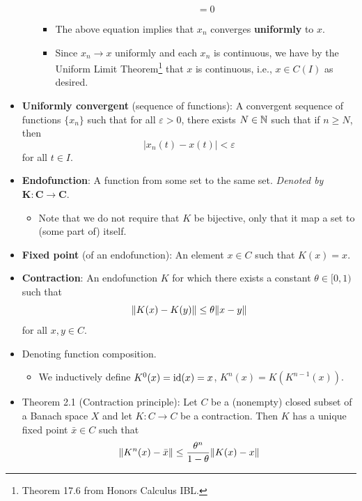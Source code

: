 \documentclass[../notes.tex]{subfiles}
\begin{document}
\begin{itemize}
\begin{itemize}
\begin{itemize}
\begin{equation*}
                = 0
            \end{equation*}
            \item The above equation implies that $x_n$ converges \textbf{uniformly} to $x$.
            \item Since $x_n\to x$ uniformly and each $x_n$ is continuous, we have by the Uniform Limit Theorem\footnote{Theorem 17.6 from Honors Calculus IBL.} that $x$ is continuous, i.e., $x\in C(I)$ as desired.
        \end{itemize}
    \end{itemize}
    \item \textbf{Uniformly convergent} (sequence of functions): A convergent sequence of functions $\{x_n\}$ such that for all $\varepsilon>0$, there exists $N\in\mathbb{N}$ such that if $n\geq N$, then
    \begin{equation*}
        |x_n(t)-x(t)| < \varepsilon
    \end{equation*}
    for all $t\in I$.
    \item \textbf{Endofunction}: A function from some set to the same set. \emph{Denoted by} $\bm{K:C\to C}$.
    \begin{itemize}
        \item Note that we do not require that $K$ be bijective, only that it map a set to (some part of) itself.
    \end{itemize}
    \item \textbf{Fixed point} (of an endofunction): An element $x\in C$ such that $K(x)=x$.
    \item \textbf{Contraction}: An endofunction $K$ for which there exists a constant $\theta\in[0,1)$ such that
    \begin{equation*}
        \norm{K(x)-K(y)} \leq \theta\norm{x-y}
    \end{equation*}
    for all $x,y\in C$.
    \item Denoting function composition.
    \begin{itemize}
        \item We inductively define $K^0(x)=\operatorname{id}(x)=x$, $K^n(x)=K(K^{n-1}(x))$.
    \end{itemize}
    \item Theorem 2.1 (Contraction principle): Let $C$ be a (nonempty) closed subset of a Banach space $X$ and let $K:C\to C$ be a contraction. Then $K$ has a unique fixed point $\bar{x}\in C$ such that
    \begin{equation*}
        \norm{K^n(x)-\bar{x}} \leq \frac{\theta^n}{1-\theta}\norm{K(x)-x}

\end{equation*}
\end{itemize}
\end{document}
